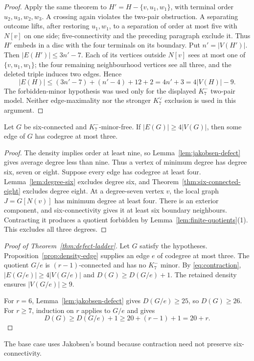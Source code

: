 \begin{proof}
Apply the same theorem to $H'=H-\{v,u_1,w_1\}$, with terminal order
$u_2,u_3,w_2,w_3$.  A crossing again violates the two-pair obstruction.
A separating outcome lifts, after restoring $u_1,w_1$, to a separation
of order at most five with $N[v]$ on one side; five-connectivity and the
preceding paragraph exclude it.  Thus $H'$ embeds in a disc with the
four terminals on its boundary.  Put $n'=|V(H')|$.  Then
$|E(H')|\leq3n'-7$.  Each of its vertices outside $N[v]$ sees at most
one of $\{v,u_1,w_1\}$; the four remaining neighbourhood vertices see
all three, and the deleted triple induces two edges.  Hence
\[
 |E(H)|\leq(3n'-7)+(n'-4)+12+2=4n'+3=4|V(H)|-9.
\]
The forbidden-minor hypothesis was used only for the displayed
$K_7^{-}$ two-pair model.  Neither edge-maximality nor the stronger
$K_7^{\vee}$ exclusion is used in this argument.
\end{proof}

\begin{proposition}\label{prop:density-edge}
Let $G$ be six-connected and $K_7^{-}$-minor-free.  If
$|E(G)|\geq4|V(G)|$, then some edge of $G$ has codegree at most three.
\end{proposition}

\begin{proof}
The density implies order at least nine, so
Lemma~\ref{lem:jakobsen-defect} gives average degree less than nine.  Thus a
vertex of minimum degree has degree six, seven or eight.  Suppose every
edge has codegree at least four.  Lemma~\ref{lem:degree-six} excludes
degree six, and Theorem~\ref{thm:six-connected-eight} excludes degree
eight.  At a degree-seven vertex $v$, the local graph $J=G[N(v)]$ has
minimum degree at least four.  There is an exterior component, and
six-connectivity gives it at least six boundary neighbours.  Contracting
it produces a quotient forbidden by Lemma~\ref{lem:finite-quotients}(1).
This excludes all three degrees.
\end{proof}

\begin{proof}[Proof of Theorem~\ref{thm:defect-ladder}]
Let $G$ satisfy the hypotheses.  Proposition~\ref{prop:density-edge}
supplies an edge $e$ of codegree at most three.  The quotient $G/e$ is
$(r-1)$-connected and has no $K_7^{-}$ minor.  By \eqref{eq:contraction},
$|E(G/e)|\geq4|V(G/e)|$ and $D(G)\geq D(G/e)+1$.
The retained density ensures $|V(G/e)|\geq9$.

For $r=6$, Lemma~\ref{lem:jakobsen-defect} gives $D(G/e)\geq25$, so
$D(G)\geq26$.  For $r\geq7$, induction on $r$ applies to $G/e$ and gives
\[
              D(G)\geq D(G/e)+1\geq20+(r-1)+1=20+r.
\]
\end{proof}

The base case uses Jakobsen's bound because contraction need not preserve
six-connectivity.
